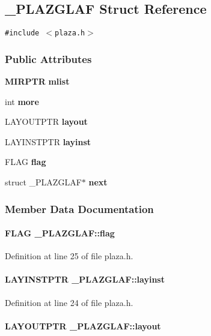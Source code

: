 \subsection{\_\-PLAZGLAF  Struct Reference}
\label{_PLAZGLAF}
{\tt \#include $<$plaza.h$>$}

\subsubsection*{Public Attributes}
\begin{CompactItemize}
\item 
{\bf MIRPTR} {\bf mlist}
\item 
int {\bf more}
\item 
LAYOUTPTR {\bf layout}
\item 
LAYINSTPTR {\bf layinst}
\item 
FLAG {\bf flag}
\item 
struct \_\-PLAZGLAF$\ast$ {\bf next}
\end{CompactItemize}


\subsubsection{Member Data Documentation}
\label{_PLAZGLAF_m4}
\paragraph{\setlength{\rightskip}{0pt plus 5cm}FLAG \_\-PLAZGLAF::flag}\hfill



Definition at line 25 of file plaza.h.\label{_PLAZGLAF_m3}
\paragraph{\setlength{\rightskip}{0pt plus 5cm}LAYINSTPTR \_\-PLAZGLAF::layinst}\hfill



Definition at line 24 of file plaza.h.\label{_PLAZGLAF_m2}
\paragraph{\setlength{\rightskip}{0pt plus 5cm}LAYOUTPTR \_\-PLAZGLAF::layout}\hfill



